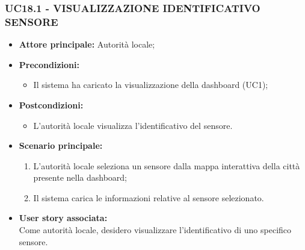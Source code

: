 \subsubsection{UC18.1 - VISUALIZZAZIONE IDENTIFICATIVO SENSORE}
\begin{itemize}
    \item \textbf{Attore principale:} Autorità locale;
    \item \textbf{Precondizioni:}
        \begin{itemize}
            \item Il sistema ha caricato la visualizzazione della dashboard (UC1);
        \end{itemize}
    \item \textbf{Postcondizioni:}
        \begin{itemize}
            \item L'autorità locale visualizza l'identificativo del sensore.
        \end{itemize}
    \item \textbf{Scenario principale:}
        \begin{enumerate}
            \item L'autorità locale seleziona un sensore dalla mappa interattiva della città presente nella dashboard;
            \item Il sistema carica le informazioni relative al sensore selezionato.
        \end{enumerate}
    \item \textbf{User story associata:} \\
        Come autorità locale, desidero visualizzare l'identificativo di uno specifico sensore.
\end{itemize}